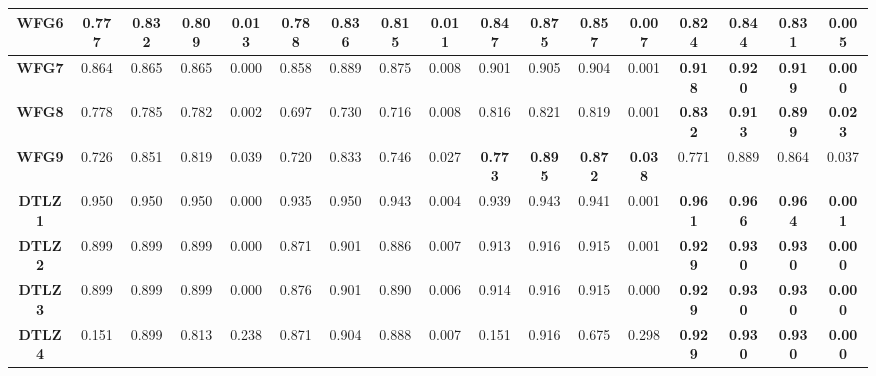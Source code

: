 \begin{table*}[t]
\begin{scriptsize}
\begin{tabular}{cc|c|c|c|c|c|c|c|c|c|c|c|c|c|c|c}
\multicolumn{1}{c|}{\textbf{WFG6}}  & 0.777          & 0.832          & 0.809          & 0.013          & 0.788        & 0.836        & 0.815         & 0.011        & \textbf{0.847} & \textbf{0.875} & \textbf{0.857} & \textbf{0.007} & 0.824          & 0.844          & 0.831          & 0.005          \\ \hline
\multicolumn{1}{c|}{\textbf{WFG7}}  & 0.864          & 0.865          & 0.865          & 0.000          & 0.858        & 0.889        & 0.875         & 0.008        & 0.901          & 0.905          & 0.904          & 0.001          & \textbf{0.918} & \textbf{0.920} & \textbf{0.919} & \textbf{0.000} \\ \hline
\multicolumn{1}{c|}{\textbf{WFG8}}  & 0.778          & 0.785          & 0.782          & 0.002          & 0.697        & 0.730        & 0.716         & 0.008        & 0.816          & 0.821          & 0.819          & 0.001          & \textbf{0.832} & \textbf{0.913} & \textbf{0.899} & \textbf{0.023} \\ \hline
\multicolumn{1}{c|}{\textbf{WFG9}}  & 0.726          & 0.851          & 0.819          & 0.039          & 0.720        & 0.833        & 0.746         & 0.027        & \textbf{0.773} & \textbf{0.895} & \textbf{0.872} & \textbf{0.038} & 0.771          & 0.889          & 0.864          & 0.037          \\ \hline
\multicolumn{1}{c|}{\textbf{DTLZ1}} & 0.950          & 0.950          & 0.950          & 0.000          & 0.935        & 0.950        & 0.943         & 0.004        & 0.939          & 0.943          & 0.941          & 0.001          & \textbf{0.961} & \textbf{0.966} & \textbf{0.964} & \textbf{0.001} \\ \hline
\multicolumn{1}{c|}{\textbf{DTLZ2}} & 0.899          & 0.899          & 0.899          & 0.000          & 0.871        & 0.901        & 0.886         & 0.007        & 0.913          & 0.916          & 0.915          & 0.001          & \textbf{0.929} & \textbf{0.930} & \textbf{0.930} & \textbf{0.000} \\ \hline
\multicolumn{1}{c|}{\textbf{DTLZ3}} & 0.899          & 0.899          & 0.899          & 0.000          & 0.876        & 0.901        & 0.890         & 0.006        & 0.914          & 0.916          & 0.915          & 0.000          & \textbf{0.929} & \textbf{0.930} & \textbf{0.930} & \textbf{0.000} \\ \hline
\multicolumn{1}{c|}{\textbf{DTLZ4}} & 0.151          & 0.899          & 0.813          & 0.238          & 0.871        & 0.904        & 0.888         & 0.007        & 0.151          & 0.916          & 0.675          & 0.298          & \textbf{0.929} & \textbf{0.930} & \textbf{0.930} & \textbf{0.000} \\ \hline

\end{tabular}
\end{scriptsize}
\end{table*}

